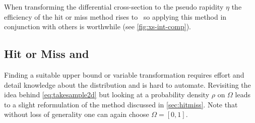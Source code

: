 When transforming the differential cross-section to the pseudo
rapidity \(\eta\) the efficiency of the hit or miss method rises
to~ so applying this method in conjunction
with others is worthwhile (see \cref{fig:xs-int-comp}).

\subsection{Hit or Miss and \vegas}%
\label{sec:stratsamp}

Finding a suitable upper bound or variable transformation requires
effort and detail knowledge about the distribution and is hard to
automate. Revisiting the idea behind \cref{eq:takesample2d} but
looking at a probability density \(\rho\) on \(\Omega\) leads to a
slight reformulation of the method discussed in
\cref{sec:hitmiss}. Note that without loss of generality one can again
choose \(\Omega = [0, 1]\).

